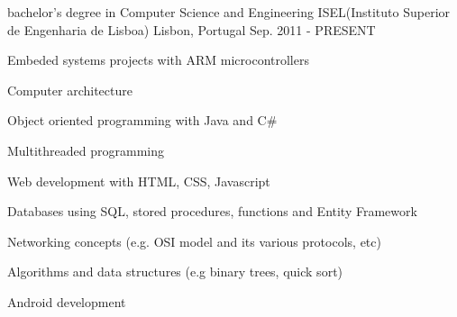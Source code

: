 


\begin{cventries}


\cventry
{bachelor's degree in Computer Science and Engineering} %
{ISEL(Instituto Superior de Engenharia de Lisboa)} %
{Lisbon, Portugal} %
{Sep. 2011 - PRESENT} %
{ %
\begin{cvitems}
\item {Embeded systems projects with ARM microcontrollers}
\item {Computer architecture}
\item {Object oriented programming with Java and C\#}
\item {Multithreaded programming}
\item {Web development with HTML, CSS, Javascript}
\item {Databases using SQL, stored procedures, functions and Entity Framework}
\item {Networking concepts (e.g. OSI model and its various protocols, etc)}
\item {Algorithms and data structures (e.g binary trees, quick sort)}
\item {Android development}
\end{cvitems}
}


\end{cventries}